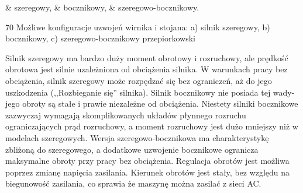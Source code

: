 \begin{easylist}
	& szeregowy,
	& bocznikowy,
	& szeregowo-bocznikowy.
\end{easylist}

		{70}
		{Możliwe konfiguracje uzwojeń wirnika i stojana: a) silnik szeregowy, b) bocznikowy, c) szeregowo-bocznikowy}
		{przepiorkowski}

Silnik szeregowy ma bardzo duży moment obrotowy i rozruchowy, ale prędkość obrotowa jest silnie uzależniona od obciążenia silnika. W warunkach pracy bez obciążenia, silnik szeregowy może rozpędzać się bez ograniczeń, aż do jego uszkodzenia (,,Rozbieganie się'' silnika). Silnik bocznikowy nie posiada tej wady- jego obroty są stałe i prawie niezależne od obciążenia. Niestety silniki bocznikowe zazwyczaj wymagają skomplikowanych układów płynnego rozruchu ograniczających prąd rozruchowy, a moment rozruchowy jest dużo mniejszy niż w modelach szeregowych. Wersja szeregowo-bocznikowa ma charakterystykę zbliżoną do szeregowego, a dodatkowe uzwojenie bocznikowe ogranicza maksymalne obroty przy pracy bez obciążenia. Regulacja obrotów jest możliwa poprzez zmianę napięcia zasilania. Kierunek obrotów jest stały, bez względu na biegunowość zasilania, co sprawia że maszynę można zasilać z sieci AC.

\clearpage

